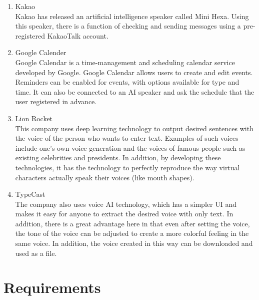 \documentclass[conference]{IEEEtran}
\begin{document}
\begin{enumerate}
    \item Kakao\\
    Kakao has released an artificial intelligence speaker called Mini Hexa. Using this speaker, there is a function of checking and sending messages using a pre-registered KakaoTalk account.\\
    \item Google Calender\\
    Google Calendar is a time-management and scheduling calendar service developed by Google. Google Calendar allows users to create and edit events. Reminders can be enabled for events, with options available for type and time. It can also be connected to an AI speaker and ask the schedule that the user registered in advance.\\
    \item Lion Rocket\\
    This company uses deep learning technology to output desired sentences with the voice of the person who wants to enter text. Examples of such voices include one's own voice generation and the voices of famous people such as existing celebrities and presidents. In addition, by developing these technologies, it has the technology to perfectly reproduce the way virtual characters actually speak their voices (like mouth shapes).\\
    \item TypeCast\\
    The company also uses voice AI technology, which has a simpler UI and makes it easy for anyone to extract the desired voice with only text. In addition, there is a great advantage here in that even after setting the voice, the tone of the voice can be adjusted to create a more colorful feeling in the same voice. In addition, the voice created in this way can be downloaded and used as a file.\\
\end{enumerate}

\section{Requirements}
\end{document}
